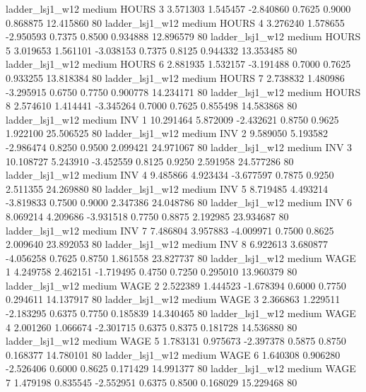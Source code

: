        ladder_lsj1_w12     medium    HOURS                 3  3.571303 1.545457 -2.840860 0.7625 0.9000  0.868875   12.415860 80
       ladder_lsj1_w12     medium    HOURS                 4  3.276240 1.578655 -2.950593 0.7375 0.8500  0.934888   12.896579 80
       ladder_lsj1_w12     medium    HOURS                 5  3.019653 1.561101 -3.038153 0.7375 0.8125  0.944332   13.353485 80
       ladder_lsj1_w12     medium    HOURS                 6  2.881935 1.532157 -3.191488 0.7000 0.7625  0.933255   13.818384 80
       ladder_lsj1_w12     medium    HOURS                 7  2.738832 1.480986 -3.295915 0.6750 0.7750  0.900778   14.234171 80
       ladder_lsj1_w12     medium    HOURS                 8  2.574610 1.414441 -3.345264 0.7000 0.7625  0.855498   14.583868 80
       ladder_lsj1_w12     medium      INV                 1 10.291464 5.872009 -2.432621 0.8750 0.9625  1.922100   25.506525 80
       ladder_lsj1_w12     medium      INV                 2  9.589050 5.193582 -2.986474 0.8250 0.9500  2.099421   24.971067 80
       ladder_lsj1_w12     medium      INV                 3 10.108727 5.243910 -3.452559 0.8125 0.9250  2.591958   24.577286 80
       ladder_lsj1_w12     medium      INV                 4  9.485866 4.923434 -3.677597 0.7875 0.9250  2.511355   24.269880 80
       ladder_lsj1_w12     medium      INV                 5  8.719485 4.493214 -3.819833 0.7500 0.9000  2.347386   24.048786 80
       ladder_lsj1_w12     medium      INV                 6  8.069214 4.209686 -3.931518 0.7750 0.8875  2.192985   23.934687 80
       ladder_lsj1_w12     medium      INV                 7  7.486804 3.957883 -4.009971 0.7500 0.8625  2.009640   23.892053 80
       ladder_lsj1_w12     medium      INV                 8  6.922613 3.680877 -4.056258 0.7625 0.8750  1.861558   23.827737 80
       ladder_lsj1_w12     medium     WAGE                 1  4.249758 2.462151 -1.719495 0.4750 0.7250  0.295010   13.960379 80
       ladder_lsj1_w12     medium     WAGE                 2  2.522389 1.444523 -1.678394 0.6000 0.7750  0.294611   14.137917 80
       ladder_lsj1_w12     medium     WAGE                 3  2.366863 1.229511 -2.183295 0.6375 0.7750  0.185839   14.340465 80
       ladder_lsj1_w12     medium     WAGE                 4  2.001260 1.066674 -2.301715 0.6375 0.8375  0.181728   14.536880 80
       ladder_lsj1_w12     medium     WAGE                 5  1.783131 0.975673 -2.397378 0.5875 0.8750  0.168377   14.780101 80
       ladder_lsj1_w12     medium     WAGE                 6  1.640308 0.906280 -2.526406 0.6000 0.8625  0.171429   14.991377 80
       ladder_lsj1_w12     medium     WAGE                 7  1.479198 0.835545 -2.552951 0.6375 0.8500  0.168029   15.229468 80
